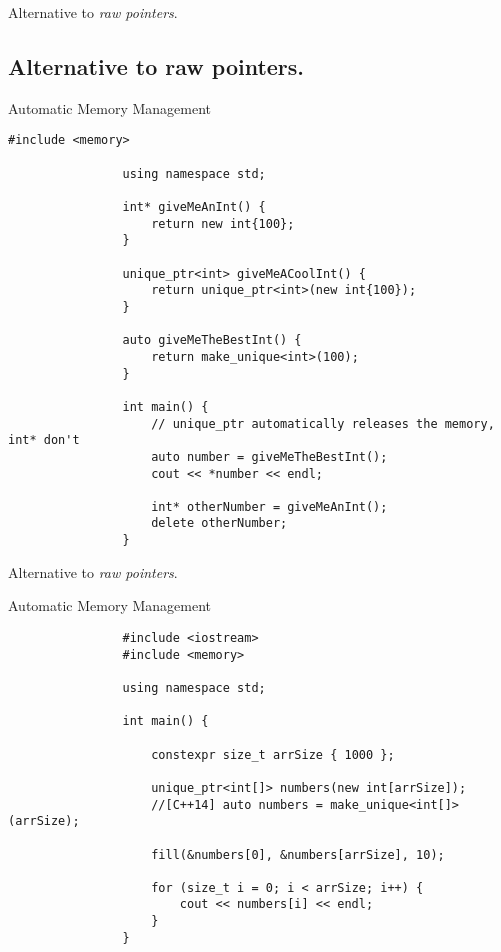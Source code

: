 \documentclass{beamer}
\newcommand{\normalSizeItem}[1] {
  \normalsize{\item #1}
}
\begin{document}
		\begin{frame}[fragile]{Alternative to \textit{raw pointers}. }	
			\subsection{Alternative to raw pointers. }
			\begin{itemize}
			
				\normalSizeItem { Automatic Memory Management }
				\begin{lstlisting}[basicstyle={\tiny\ttfamily}]
				#include <memory>
				
				using namespace std;
				
				int* giveMeAnInt() { 
					return new int{100};
				}
				
				unique_ptr<int> giveMeACoolInt() {
					return unique_ptr<int>(new int{100});
				}
				
				auto giveMeTheBestInt() {
					return make_unique<int>(100);
				}
				
				int main() {	
					// unique_ptr automatically releases the memory, int* don't
					auto number = giveMeTheBestInt();
					cout << *number << endl;
					
					int* otherNumber = giveMeAnInt();
					delete otherNumber;
				}
				\end{lstlisting}				
			\end{itemize}
		\end{frame}
		
		\begin{frame}[fragile]{Alternative to \textit{raw pointers}. }	
			\begin{itemize}
			
				\normalSizeItem { Automatic Memory Management }
				\begin{lstlisting}
				#include <iostream>
				#include <memory>
				
				using namespace std;
				
				int main() {	
					
					constexpr size_t arrSize { 1000 };
					
					unique_ptr<int[]> numbers(new int[arrSize]);
					//[C++14] auto numbers = make_unique<int[]>(arrSize);
					
					fill(&numbers[0], &numbers[arrSize], 10);
					
					for (size_t i = 0; i < arrSize; i++) {
						cout << numbers[i] << endl;
					}
				}
				\end{lstlisting}				
			\end{itemize}
		\end{frame}
		
\end{document}
